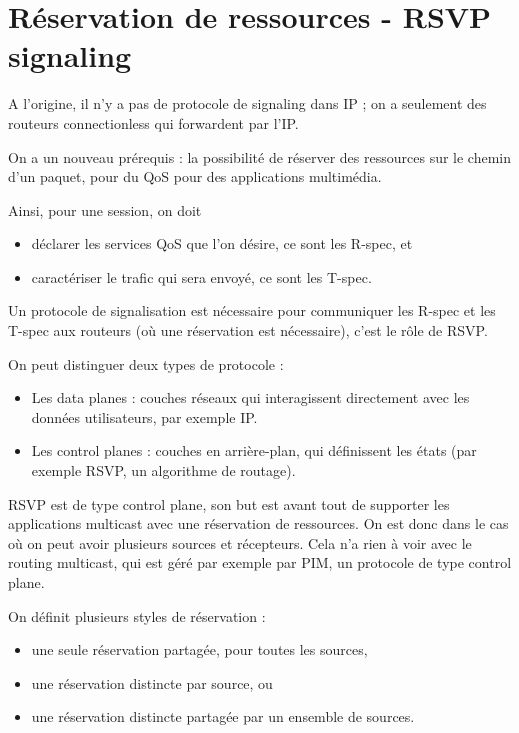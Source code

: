		\section{Réservation de ressources - RSVP signaling}
		
		A l'origine, il n'y a pas de protocole de signaling dans IP ; on a seulement des routeurs connectionless qui forwardent par  l'IP.
		
		On a un nouveau prérequis : la possibilité de réserver des ressources sur le chemin d'un paquet, pour du QoS pour des applications multimédia.
		
		Ainsi, pour une session, on doit
		
		\begin{itemize}
			\item déclarer les services QoS que l'on désire, ce sont les R-spec, et
			\item caractériser le trafic qui sera envoyé, ce sont les T-spec.
		\end{itemize}
		
		Un protocole de signalisation est nécessaire pour communiquer les R-spec et les T-spec aux routeurs (où une réservation est nécessaire), c'est le rôle de RSVP.
		
		On peut distinguer deux types de protocole :
		
		\begin{itemize}
			\item Les data planes : couches réseaux qui interagissent directement avec les données utilisateurs, par exemple IP.
			\item Les control planes : couches en arrière-plan, qui définissent les états (par exemple RSVP, un algorithme de routage).
		\end{itemize}
		
		RSVP est de type control plane, son but est avant tout de supporter les applications multicast avec une réservation de ressources. On est donc dans le cas où on peut avoir plusieurs sources et récepteurs. Cela n'a rien à voir avec le routing multicast, qui est géré par exemple par PIM, un protocole de type control plane.
		
		On définit plusieurs styles de réservation :
		
		\begin{itemize}
			\item une seule réservation partagée, pour toutes les sources,
			\item une réservation distincte par source, ou
			\item une réservation distincte partagée par un ensemble de sources.
		\end{itemize}
			

